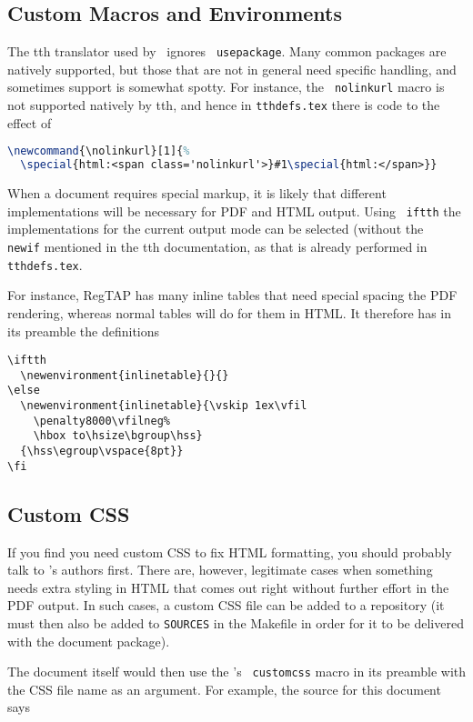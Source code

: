 \documentclass[11pt,a4paper]{ivoa}
\newcommand{\texword}[1]{\texttt{\color{texcolor} #1}}
\begin{document}
\subsection{Custom Macros and Environments}

The tth translator used by \ivoatex\ ignores \texword{usepackage}.  Many
common packages are natively supported, but those that are not in
general need specific handling, and sometimes support is somewhat spotty.  
For instance, the \texword{nolinkurl}
macro is not supported natively by tth, and hence in
\texttt{tthdefs.tex} there is code to the effect of
\begin{lstlisting}[language=TeX]
\newcommand{\nolinkurl}[1]{%
  \special{html:<span class='nolinkurl'>}#1\special{html:</span>}}
\end{lstlisting}

When a document requires special markup, it is likely that 
different implementations will be necessary for PDF and HTML output.
Using \texword{iftth} the implementations for the current output mode
can be selected (without the \texword{newif} mentioned in the tth
documentation, as that is already performed in \texttt{tthdefs.tex}.

For instance, RegTAP has many inline tables that need special spacing
the PDF rendering, whereas normal tables will do for them
in HTML.  It therefore
has in its preamble the definitions
\begin{lstlisting}
\iftth
  \newenvironment{inlinetable}{}{}
\else
  \newenvironment{inlinetable}{\vskip 1ex\vfil
    \penalty8000\vfilneg%
    \hbox to\hsize\bgroup\hss}
  {\hss\egroup\vspace{8pt}}
\fi
\end{lstlisting}


\subsection{Custom CSS}
\label{sect:customcss}

If you find you need custom CSS to fix HTML formatting, you should
probably talk to \ivoatex's authors first.  There are, however, 
legitimate cases when something needs extra styling in HTML that 
comes out right without further effort
in the PDF output.  In such cases, a custom CSS file can
be added to a repository (it must then also be added to \texttt{SOURCES}
in the Makefile in order for it to be delivered with the document
package).

The document itself would then use the \ivoatex's \texword{customcss}
macro in its preamble with the CSS file name as an argument.  For
example, the source for this document says
\end{document}
